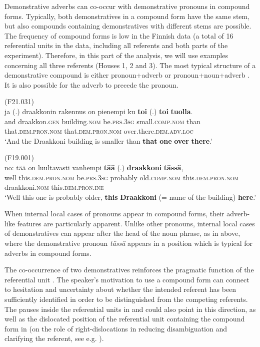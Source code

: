 \documentclass[output=paper,colorlinks,citecolor=brown]{langscibook}
\begin{document}
Demonstrative adverbs can co-occur with demonstrative pronouns in compound forms. Typically, both demonstratives in a compound form have the same stem, but also compounds containing demonstratives with different stems are possible. The frequency of compound forms is low in the Finnish data (a total of 16 referential units in the data, including all referents and both parts of the experiment). Therefore, in this part of the analysis, we will use examples concerning all three referents (Houses 1, 2 and 3). The most typical structure of a demonstrative compound is either pronoun+adverb  or pronoun+noun+adverb . It is also possible for the adverb to precede the pronoun.

\ea\label{ex:nahkola:12} (F21.031)\\
\gll ja (.) draakkonin rakennus on pienempi ku \textbf{toi} (.) \textbf{toi} \textbf{tuolla}.\\
     and {} draakkon.\textsc{gen} building.\textsc{nom} be.\textsc{prs.3sg} small.\textsc{comp.nom} than that.\textsc{dem.pron.nom} {} that.\textsc{dem.pron.nom} over.there.\textsc{dem.adv.loc}\\
\glt ‘And the Draakkoni building is smaller than \textbf{that} \textbf{one} \textbf{over} \textbf{there}.’ 
\z

\ea\label{ex:nahkola:13} (F19.001)\\
\gll no: tää on luultavasti vanhempi \textbf{tää} (.) \textbf{draakkoni} \textbf{tässä},\\
     well this.\textsc{dem.pron.nom} be.\textsc{prs.3sg} probably old.\textsc{comp.nom} this.\textsc{dem.pron.nom} {} draakkoni.\textsc{nom} this.\textsc{dem.pron.ine}\\
\glt ‘Well this one is probably older, \textbf{this} \textbf{Draakkoni} (= name of the building) \textbf{here}.’ 
\z

When internal local cases of pronouns appear in compound forms, their adverb-like features are particularly apparent. Unlike other pronouns, internal local cases of demonstratives can appear after the head of the noun phrase, as in  above, where the demonstrative pronoun \textit{tässä} appears in a position which is typical for adverbs in compound forms.

The co-occurrence of two demonstratives reinforces the pragmatic function of the referential unit \citep[474]{Diessel2006}. The speaker’s motivation to use a compound form can connect to hesitation and uncertainty about whether the intended referent has been sufficiently identified in order to be distinguished from the competing referents. The pauses inside the referential units in  and  could also point in this direction, as well as the dislocated position of the referential unit containing the compound form in  (on the role of right-dislocations in reducing disambiguation and clarifying the referent, see e.g. \citealt{Geluykens1987}).
\end{document}
